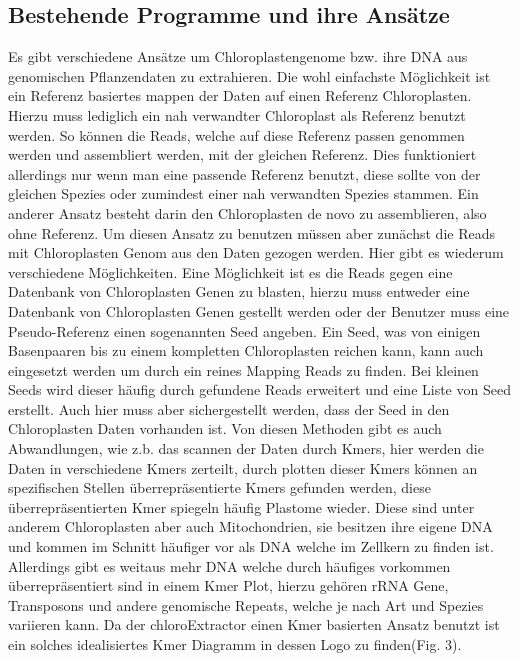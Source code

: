 \documentclass{scrartcl}
\begin{document}
\subsection{Bestehende Programme und ihre Ansätze}
\label{sec-2-5}
Es gibt verschiedene Ansätze um Chloroplastengenome bzw. ihre DNA aus genomischen Pflanzendaten zu extrahieren. Die wohl einfachste Möglichkeit ist ein Referenz basiertes
mappen der Daten auf einen Referenz Chloroplasten. Hierzu muss lediglich ein nah verwandter Chloroplast als Referenz benutzt werden. So können die Reads, welche auf diese Referenz
passen genommen werden und assembliert werden, mit der gleichen Referenz. Dies funktioniert allerdings nur wenn man eine passende Referenz benutzt, diese sollte von der gleichen Spezies oder
zumindest einer nah verwandten Spezies stammen. Ein anderer Ansatz besteht darin den Chloroplasten de novo zu assemblieren, also ohne Referenz. Um diesen Ansatz zu benutzen müssen
aber zunächst die Reads mit Chloroplasten Genom aus den Daten gezogen werden. Hier gibt es wiederum verschiedene Möglichkeiten. Eine Möglichkeit ist es die Reads gegen eine Datenbank
von Chloroplasten Genen zu blasten, hierzu muss entweder eine Datenbank von Chloroplasten Genen gestellt werden oder der Benutzer muss eine Pseudo-Referenz einen sogenannten Seed angeben.
Ein Seed, was von einigen Basenpaaren bis zu einem kompletten Chloroplasten reichen kann, kann auch eingesetzt werden um durch ein reines Mapping Reads zu finden. Bei kleinen Seeds wird dieser
häufig durch gefundene Reads erweitert und eine Liste von Seed erstellt. Auch hier muss aber sichergestellt werden, dass der Seed in den Chloroplasten Daten vorhanden ist.
Von diesen Methoden gibt es auch Abwandlungen, wie z.b. das scannen der Daten durch Kmers, hier werden die Daten in verschiedene Kmers zerteilt, durch plotten dieser Kmers können
an spezifischen Stellen überrepräsentierte Kmers gefunden werden, diese überrepräsentierten Kmer spiegeln häufig Plastome wieder. Diese sind unter anderem Chloroplasten aber auch
Mitochondrien, sie besitzen ihre eigene DNA und kommen im Schnitt häufiger vor als DNA welche im Zellkern zu finden ist. Allerdings gibt es weitaus mehr DNA welche durch häufiges vorkommen
überrepräsentiert sind in einem Kmer Plot, hierzu gehören rRNA Gene, Transposons und andere genomische Repeats, welche je nach Art und Spezies variieren kann. 
Da der chloroExtractor einen Kmer basierten Ansatz benutzt ist ein solches idealisiertes Kmer Diagramm in dessen Logo zu finden(Fig. 3).
\end{document}
